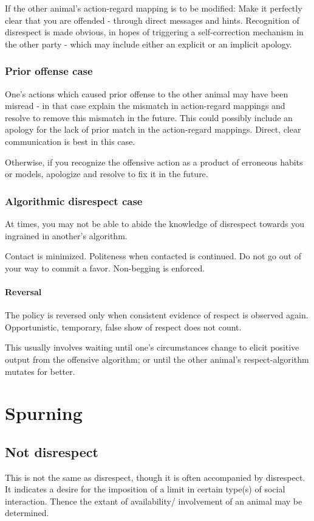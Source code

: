 \documentclass[oneside, article]{memoir}
\begin{document}
If the other animal's action-regard mapping is to be modified: Make it perfectly clear that you are offended - through direct messages and hints. Recognition of disrespect is made obvious, in hopes of triggering a self-correction mechanism in the other party - which may include either an explicit or an implicit apology.

\subsubsection{Prior offense case}
One's actions which caused prior offense to the other animal may have been misread - in that case explain the mismatch in action-regard mappings and resolve to remove this mismatch in the future. This could possibly include an apology for the lack of prior match in the action-regard mappings. Direct, clear communication is best in this case.

Otherwise, if you recognize the offensive action as a product of erroneous habits or models, apologize and resolve to fix it in the future.

\subsubsection{Algorithmic disrespect case}
At times, you may not be able to abide the knowledge of  disrespect towards you ingrained in another's algorithm. 

\subitem Contact is minimized.
\subitem Politeness when contacted is continued.
\subitem Do not go out of your way to commit a favor.
\subitem Non-begging is enforced.

\paragraph{Reversal}
The policy is reversed only when consistent evidence of respect is observed again. Opportunistic, temporary, false show of respect does not count.

This usually involves waiting until one's circumstances change to elicit positive output from the offensive algorithm; or until the other animal's respect-algorithm mutates for better.

\section{Spurning}
\subsection{Not disrespect}
This is not the same as disrespect, though it is often accompanied by disrespect. It indicates a desire for the imposition of a limit in certain type(s) of social interaction. Thence the extant of availability/ involvement of an animal may be determined.
\end{document}
